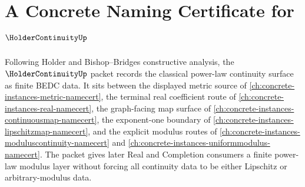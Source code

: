\chapter{A Concrete Naming Certificate for $\HolderContinuityUp$}
\label{ch:concrete-instances-holder-continuity-namecert}

Following Holder and Bishop--Bridges constructive analysis, the $\HolderContinuityUp$ packet records the classical power-law continuity surface as finite BEDC data. It sits between the displayed metric source of \autoref{ch:concrete-instances-metric-namecert}, the terminal real coefficient route of \autoref{ch:concrete-instances-real-namecert}, the graph-facing map surface of \autoref{ch:concrete-instances-continuousmap-namecert}, the exponent-one boundary of \autoref{ch:concrete-instances-lipschitzmap-namecert}, and the explicit modulus routes of \autoref{ch:concrete-instances-moduluscontinuity-namecert} and \autoref{ch:concrete-instances-uniformmodulus-namecert}. The packet gives later Real and Completion consumers a finite power-law modulus layer without forcing all continuity data to be either Lipschitz or arbitrary-modulus data.

